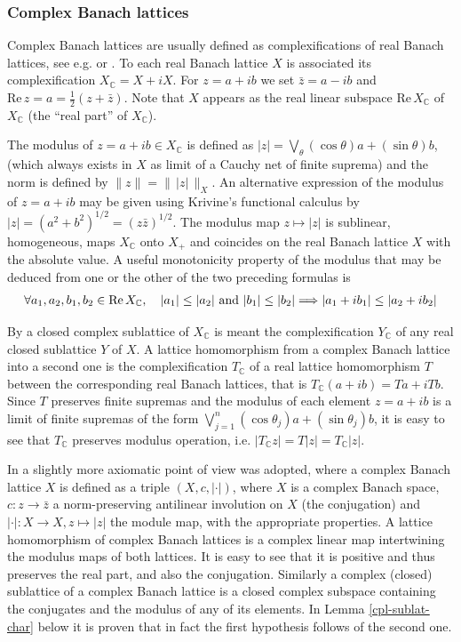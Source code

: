 \documentclass[11pt]{amsart}
\theoremstyle{plain}
\theoremstyle{remark}
\renewcommand{\Re}{\mathrm {Re\,}}
\begin{document}
\subsubsection{Complex Banach lattices}\label{subsubsec:BL-complex}

Complex Banach lattices are usually defined as complexifications of real
Banach lattices, see e.g. \cite[\S 2.2]{MN} or \cite[\S 3.2]{AA}. To each real Banach lattice $X$ 
is associated its complexification $X_\mathbb C = X+iX$. For $z=a+ib$ we set 
$\bar z=a-ib$ and $\Re z=a=\frac 12 (z+\bar z)$. Note that $X$ appears as the real 
linear subspace $\Re X_\mathbb C$ of $X_\mathbb C$ (the ``real part'' of $X_\mathbb C$).  

The modulus of $z=a+ib\in X_\mathbb C$ is defined as $|z|= \bigvee\limits_\theta 
(\cos\theta) a+(\sin\theta) b$, (which always exists in $X$ as limit of a Cauchy net of 
finite suprema) and the norm is defined by $\|z\|=\|\,|z|\,\|_X$. An alternative expression of the modulus of $z=a+ib$ may be given using Krivine's functional calculus \cite[Theorem 1.d.1]{LT} \nobreak by $ |z|=(a^2+b^2)^{1/2}=({z\bar z})^{1/2}$.
The modulus map $z\mapsto |z|$ is sublinear, homogeneous, maps $X_\mathbb C$ onto $X_+$ and coincides on the real Banach lattice $X$ with the absolute value. A useful monotonicity property  of the modulus that may be deduced from one or the other of the two preceding formulas is
\begin{align}\label{modulus-monotonicity}
\forall a_1,a_2,b_1,b_2\in \Re X_\mathbb C,\quad |a_1|\le |a_2| \hbox{ and } |b_1|\le |b_2|\Longrightarrow |a_1+ib_1|\le |a_2+ib_2|
\end{align}

By a closed complex sublattice of $X_\mathbb C$ is meant  the complexification $Y_\mathbb C$ of any real closed sublattice $Y$ of $X$. A lattice homomorphism from a complex Banach lattice into a second one is the complexification $T_\mathbb C$ of a real lattice homomorphism $T$ between the corresponding real Banach lattices, that is $T_\mathbb C(a+ib)=Ta+iTb$. Since $T$ preserves finite supremas and the modulus of each element $z=a+ib$ is a limit of finite supremas of the form $\bigvee\limits_{j=1}^n (\cos\theta_j) a+(\sin\theta_j) b$, it is easy to see that $T_\mathbb C$ preserves modulus operation, i.e. $|T_\mathbb C z|=T|z|=T_\mathbb C|z|$.
 
 In \cite{HR} a slightly more axiomatic point of view was adopted, where a complex Banach lattice $X$ is defined as a triple $(X,c,|\cdot |)$, where $X$ is a complex Banach space, $c:z\to \bar z$ a norm-preserving antilinear involution on $X$ (the conjugation) and $|\cdot |: X\to X, z\mapsto |z|$ the module map, with the appropriate properties. A lattice homomorphism of complex Banach lattices is a complex linear map intertwining the modulus maps of both lattices. It is easy to see that it is positive and thus preserves the real part, and also the conjugation. Similarly a complex (closed) sublattice of a complex Banach lattice is a closed complex subspace  containing the conjugates and the modulus of any of its elements. In Lemma \ref{cpl-sublat-char} below it is proven that in fact the first hypothesis follows of the second one.
\end{document}

